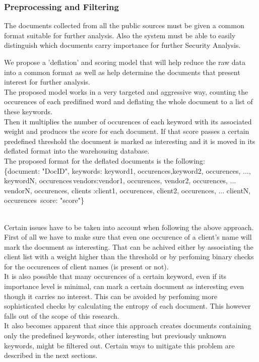 \documentclass[12pt]{article}
\newcounter{subsubsubsection}[subsubsection]
\begin{document}
\newpage
\subsubsection{Preprocessing and Filtering}
The documents collected from all the public sources must be given a common format suitable for further analysis. Also the system must be able to easily distinguish which documents carry importance for further Security Analysis. 

We propose a 'deflation' and scoring model that will help reduce the raw data into a common format as well as help determine the documents that present interest for further analysis. 
\hfill \break\\
The proposed model works in a very targeted and aggressive way, counting the occurences of each predifined word and deflating the whole document to a list of these keywords. 
\hfill \break\\
Then it multiplies the number of occurences of each keyword with its associated weight and produces the score for each document. If that score passes a certain predefined threshold the document is marked as interesting and it is moved in its deflated format into the warehousing database. 
\hfill \break\\
The proposed format for the deflated documents is the following:\\

\{document: "DocID", keywords: \lbrack \lbrack keyword1, occurences\rbrack,\lbrack keyword2, occurences\rbrack, ..., \lbrack keywordN, occurences\rbrack \rbrack\,vendors:\lbrack\lbrack vendor1, occurences\rbrack, \lbrack vendor2, occurences\rbrack, ... \lbrack vendorN, occurences\rbrack  \rbrack, clients :\lbrack\lbrack client1, occurences\rbrack, \lbrack client2, occurences\rbrack, ... \lbrack clientN, occurences\rbrack  \rbrack\, score: "score"\}

\hfill \break\\
Certain issues have to be taken into account when following the above approach. First of all we have to make sure that even one occurence of a client's name will mark the document as interesting. That can be achived either by associating the client list with a weight higher than the threshold or by perfoming binary checks for the occurences of client names (is present or not). 
\hfill \break\\
It is also possible that many occurences of a certain keyword, even if its importance level is minimal, can mark a certain document as interesting even though it carries no interest. This can be avoided by perfoming more sophisticated checks by calculating the entropy of each document. This however falls out of the scope of this research.
\hfill \break\\
It also becomes apparent that since this approach creates documents containing only the predefined keywords, other interesting but previously unknown keywords, might be filtered out. Certain ways to mitigate this problem are described in the next sections. 
\end{document}
